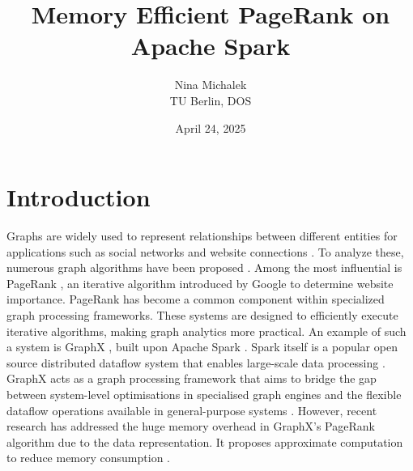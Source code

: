 \documentclass[a4paper,12pt]{article}
\title{Memory Efficient PageRank on Apache Spark}
\author{Nina Michalek\\TU Berlin, DOS}
\date{April 24, 2025}
\begin{document}
\maketitle


\section{Introduction}
 Graphs are widely used to represent relationships between different entities for applications such as social networks and website connections \cite{zhang_distributed_2021}. 
To analyze these, numerous graph algorithms have been proposed \cite{malewicz_pregel_2010}\cite{low_distributed_2012}\cite{koch_empirical_2016}. Among the most influential is PageRank \cite{page_pagerank_1999}, an iterative algorithm introduced by Google to determine website importance. PageRank has become a common component within specialized graph processing frameworks. These systems are designed to efficiently execute iterative algorithms, making graph analytics more practical. An example of such a system is GraphX \cite{xin_graphx_2013}, built upon Apache Spark \cite{xin_graphx_2013}. Spark itself is a popular open source distributed dataflow system that enables large-scale data processing \cite{shanahan_large_2015}. GraphX acts as a graph processing framework that aims to bridge the gap between system-level optimisations in specialised graph engines and the flexible dataflow operations available in general-purpose systems \cite{jin_software_2022}. However, recent research has addressed the huge memory overhead in GraphX's PageRank algorithm due to the data representation. It proposes approximate computation to reduce memory consumption \cite{wu_efficient_2024}. 
 
\end{document}
